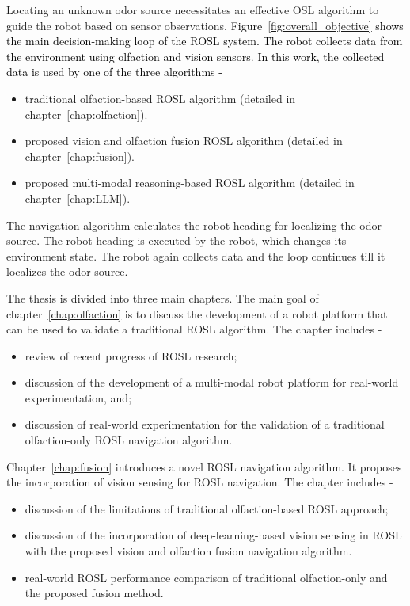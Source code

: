 Locating an unknown odor source necessitates an effective OSL algorithm to guide the robot based on sensor observations. \textcolor{black}{Figure~\ref{fig:overall_objective} shows the main decision-making loop of the ROSL system. The robot collects data from the environment using olfaction and vision sensors. In this work, the collected data is used by one of the three algorithms -}
\begin{itemize}
    \item traditional olfaction-based ROSL algorithm (detailed in chapter~\ref{chap:olfaction}).
    \item proposed vision and olfaction fusion ROSL algorithm (detailed in chapter~\ref{chap:fusion}).
    \item proposed multi-modal reasoning-based ROSL algorithm (detailed in chapter~\ref{chap:LLM}).
\end{itemize}
The navigation algorithm calculates the robot heading for localizing the odor source. The robot heading is executed by the robot, which changes its environment state. The robot again collects data and the loop continues till it localizes the odor source.

The thesis is divided into three main chapters. The main goal of chapter~\ref{chap:olfaction} is to discuss the development of a robot platform that can be used to validate a traditional ROSL algorithm. The chapter includes -
\begin{itemize}
    \item review of recent progress of ROSL research;
    \item discussion of the development of a multi-modal robot platform for real-world experimentation, and;
    \item discussion of real-world experimentation for the validation of a traditional olfaction-only ROSL navigation algorithm.
\end{itemize}

Chapter~\ref{chap:fusion} introduces a novel ROSL navigation algorithm. It proposes the incorporation of vision sensing for ROSL navigation. The chapter includes -
\begin{itemize}
    \item discussion of the limitations of traditional olfaction-based ROSL approach;
    \item discussion of the incorporation of deep-learning-based vision sensing in ROSL with the proposed vision and olfaction fusion navigation algorithm. 
    \item real-world ROSL performance comparison of traditional olfaction-only and the proposed fusion method.
\end{itemize}

